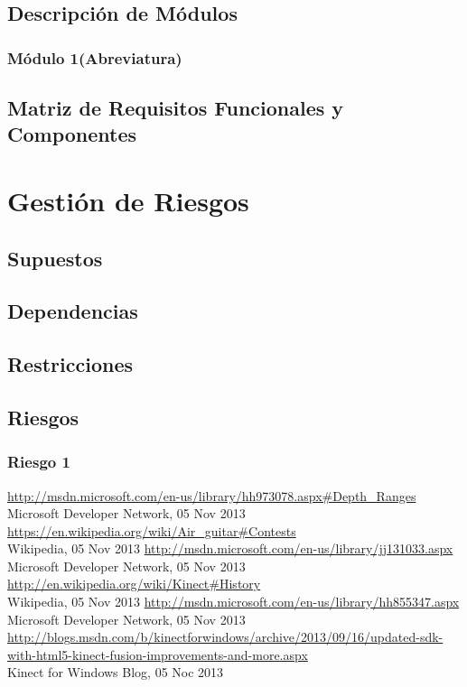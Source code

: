 \documentclass[a4paper,12pt]{article}
\begin{document}
\subsection{Descripción de Módulos}
\subsubsection{Módulo 1(Abreviatura)}
\subsection{Matriz de Requisitos Funcionales y Componentes}

\section{Gestión de Riesgos}
\subsection{Supuestos}
\subsection{Dependencias}
\subsection{Restricciones}
\subsection{Riesgos}
\subsubsection{Riesgo 1}

\newpage 
\appendix 
\newpage

\begin{thebibliography}{99}
\url{http://msdn.microsoft.com/en-us/library/hh973078.aspx#Depth_Ranges} \\
        Microsoft Developer Network, 05 Nov 2013
\url{https://en.wikipedia.org/wiki/Air_guitar#Contests} \\
        Wikipedia, 05 Nov 2013
\url{http://msdn.microsoft.com/en-us/library/jj131033.aspx} \\
        Microsoft Developer Network, 05 Nov 2013
\url{http://en.wikipedia.org/wiki/Kinect#History} \\
        Wikipedia, 05 Nov 2013
\url{http://msdn.microsoft.com/en-us/library/hh855347.aspx} \\
        Microsoft Developer Network, 05 Nov 2013
\url{http://blogs.msdn.com/b/kinectforwindows/archive/2013/09/16/updated-sdk-with-html5-kinect-fusion-improvements-and-more.aspx} \\
        Kinect for Windows Blog, 05 Noc 2013
\end{thebibliography}
\end{document}
